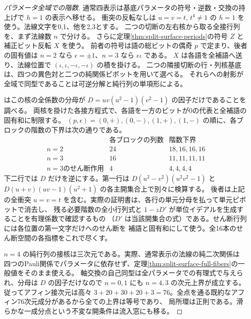\begin{proof}[パラメータ全域での階数]
通常四表示は基底パラメータの符号・逆数・交換の持上げで $h=1$ の表示へ移せる。
衝突の反転なしは $u=v=t$, $t^4\ne1$ の $h=1$ を使う。法線文字を0,1、他を2,3とする。
二つの切断の左右核から取る全接行列を、まず法線数 $n$ で分ける。
さらに定理\ref{thm:split-surface-periods}の符号 $Z$ と補正ビット反転 $X$ を使う。
前者の符号は語の総ビットの偶奇 $p$ で定まり、後者の固有値は
$n=2$ なら $\epsilon=\pm1$、$n=3$ なら $\epsilon\iota$ である。
$X$ は各語を全補語へ送り、法線位置で $(\iota,\iota,-\iota,-\iota)$ の積を掛ける。
二つの隣接切断の行・列核基底は、四つの異色対と二つの純関係ピボットを用いて選べる。
それらへの射影が全域で同型であることは可逆分解と純行列の単項形による。

 はこの核の全係数の分母が
$D=uv(u^2-1)(v^2-1)$ の因子だけであることを調べる。
両核を掛けた各接方程式で、各語を一方のビットが0の代表と全補語の固有和に制限する。
$(p,\epsilon)=(0,+),(0,-),(1,+),(1,-)$ の順に、各ブロックの階数の下界は次の通りである。
\[
\begin{array}{c|c|c}
 &\text{各ブロックの列数}&\text{階数下界}\\\hline
 n=2 &24&18,16,16,16\\
 n=3 &16&11,11,11,11\\
 n=3\text{のせん断作用}&4&4,4,4,4
\end{array}
\]
下二行では $D$ だけを逆にする。第一行は
$D(u^2-v^2)(u^2v^2-1)$ と $D(u+v)(uv-1)(u^2+1)$ の各主開集合上で別々に検算する。
後者は上記の全衝突 $u=v=t$ を含む。実際の証明書は、各行の単元分母を払って単元ピボットで消去し、
残る必要階数の全小行列式と $1-zD'$ が単位イデアルを生成することを有理係数で確認するもの
（$D'$ は当該開集合の式）である。せん断行列には各位置の第一文字だけへのせん断を
補語と固有和にして使う。全16本のせん断空間の各指標をこれで尽くす。

$n=4$ の純行列の接核は三次元である。実際、通常表示の法線の純二次関係は
四つのPauli関係でパラメータに依存せず、定理\ref{thm:split-surface-full-fibers}の一般値をそのまま使える。
軸交換の自己同型は全パラメータでの有理式で与えられ、分母は $D$ の因子だけなので
$n=0,1$ にも $n=4,3$ の次元上界が成立する。従ってアフィン接次元は高々
$3+20+30+20+3=76$。全点を通る既約なアフィン76次元成分があるから全ての上界は等号であり、
局所環は正則である。滑らかな一成分点という不変な開条件は流入窓にも移る。
\end{proof}
